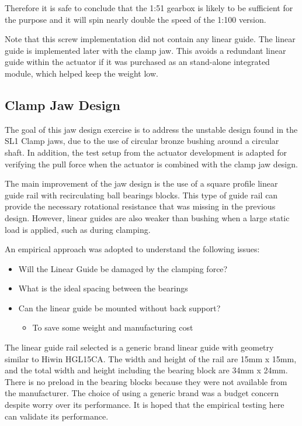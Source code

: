 \begin{itemize}
Therefore it is safe to conclude that the 1:51 gearbox is likely to be sufficient for the purpose and it will spin nearly double the speed of the 1:100 version.

Note that this screw implementation did not contain any linear guide. The linear guide is implemented later with the clamp jaw. This avoids a redundant linear guide within the actuator if it was purchased as an stand-alone integrated module, which helped keep the weight low.  

\subsection{Clamp Jaw Design}

The goal of this jaw design exercise is to address the unstable design found in the SL1 Clamp jaws, due to the use of circular bronze bushing around a circular shaft. In addition, the test setup from the actuator development is adapted for verifying the pull force when the actuator is combined with the clamp jaw design.

The main improvement of the jaw design is the use of a square profile linear guide rail with recirculating ball bearings blocks. This type of guide rail can provide the necessary rotational resistance that was missing in the previous design. However, linear guides are also weaker than bushing when a large static load is applied, such as during clamping.

An empirical approach was adopted to understand the following issues:
\begin{itemize}
\item Will the Linear Guide be damaged by the clamping force?
\item What is the ideal spacing between the bearings
\item Can the linear guide be mounted without back support?
    \begin{itemize}
    \item To save some weight and manufacturing cost
    \end{itemize}
\end{itemize}

    The linear guide rail selected is a generic brand linear guide with geometry similar to Hiwin HGL15CA. The width and height of the rail are 15mm x 15mm, and the total width and height including the bearing block are 34mm x 24mm. There is no preload in the bearing blocks because they were not available from the manufacturer. The choice of using a generic brand was a budget concern despite worry over its performance. It is hoped that the empirical testing here can validate its performance.


\end{itemize}

